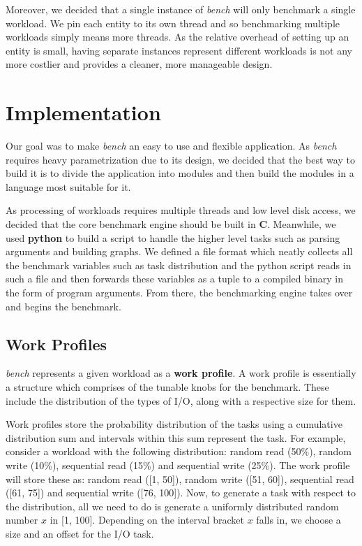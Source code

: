 \documentclass[10pt, author, twocolumn]{article}
\begin{document}
Moreover, we decided that a single instance of \textit{bench} will only benchmark a single workload. We pin each entity to its own thread and so benchmarking multiple workloads simply means more threads. As the relative overhead of setting up an entity is small, having separate instances represent different workloads is not any more costlier and provides a cleaner, more manageable design. 

\section{Implementation}
Our goal was to make \textit{bench} an easy to use and flexible application. As \textit{bench} requires heavy parametrization due to its design, we decided that the best way to build it is to divide the application into modules and then build the modules in a language most suitable for it.

As processing of workloads requires multiple threads and low level disk access, we decided that the core benchmark engine should be built in \textbf{C}. Meanwhile, we used \textbf{python} to build a script to handle the higher level tasks such as parsing arguments and building graphs. We defined a file format which neatly collects all the benchmark variables such as task distribution and the python script reads in such a file and then forwards these variables as a tuple to a compiled binary in the form of program arguments. From there, the benchmarking engine takes over and begins the benchmark. 

\subsection{Work Profiles}
\textit{bench} represents a given workload as a \textbf{work profile}. A work profile is essentially a structure which comprises of the tunable knobs for the benchmark. These include the distribution of the types of I/O, along with a respective size for them. 

Work profiles store the probability distribution of the tasks using a cumulative distribution sum and intervals within this sum represent the task. For example, consider a workload with the following distribution: random read (50\%), random write (10\%), sequential read (15\%) and sequential write (25\%). The work profile will store these as: random read ([1, 50]), random write ([51, 60]), sequential read ([61, 75]) and sequential write ([76, 100]). Now, to generate a task with respect to the distribution, all we need to do is generate a uniformly distributed random number $x$ in [1, 100]. Depending on the interval bracket $x$ falls in, we choose a size and an offset for the I/O task. 
\end{document}
